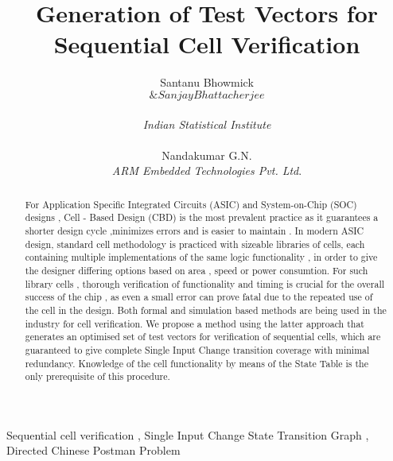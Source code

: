 \documentclass[final]{ieee}
\begin{document}
\title{Generation of Test Vectors for Sequential Cell Verification}
\author{Santanu Bhowmick$$ \& Sanjay Bhattacherjee$$ \\ \textit{Indian Statistical Institute} \\ \\ Nandakumar G.N. \\ \textit{ARM Embedded Technologies Pvt. Ltd}.}
\maketitle

\begin{abstract}
For Application Specific Integrated Circuits (ASIC) and System-on-Chip (SOC) designs , Cell - Based Design (CBD) is the most prevalent practice as it guarantees a shorter design cycle ,minimizes errors and is easier to maintain . In modern ASIC design, standard cell methodology is practiced with sizeable libraries of cells, each containing multiple implementations of the same logic functionality , in order to give the designer differing options based on area , speed or power consumtion. For such library cells , thorough verification of functionality and timing is crucial for the overall success of the chip , as even a small error can prove fatal due to the repeated use of the cell in the design. Both formal and simulation based methods are being used in the industry for cell verification. We propose a method using the latter approach that generates an optimised set of test vectors for verification of sequential cells, which are guaranteed to give complete Single Input Change transition coverage with minimal redundancy. Knowledge of the cell functionality by means of the State Table is the only prerequisite of this procedure.
\end{abstract}

\begin{keywords}
Sequential cell verification , Single Input Change State Transition Graph , Directed Chinese Postman Problem
\end{keywords}
\end{document}
